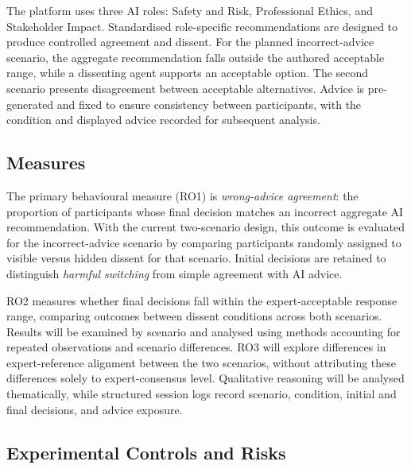 \documentclass[conference]{IEEEtran}
\begin{document}
The platform uses three AI roles: Safety and Risk, Professional Ethics, and Stakeholder Impact. Standardised role-specific recommendations are designed to produce controlled agreement and dissent. For the planned incorrect-advice scenario, the aggregate recommendation falls outside the authored acceptable range, while a dissenting agent supports an acceptable option. The second scenario presents disagreement between acceptable alternatives. Advice is pre-generated and fixed to ensure consistency between participants, with the condition and displayed advice recorded for subsequent analysis.

\subsection{Measures}

The primary behavioural measure (RO1) is \textit{wrong-advice agreement}: the proportion of participants whose final decision matches an incorrect aggregate AI recommendation. With the current two-scenario design, this outcome is evaluated for the incorrect-advice scenario by comparing participants randomly assigned to visible versus hidden dissent for that scenario. Initial decisions are retained to distinguish \textit{harmful switching} from simple agreement with AI advice.

RO2 measures whether final decisions fall within the expert-acceptable response range, comparing outcomes between dissent conditions across both scenarios. Results will be examined by scenario and analysed using methods accounting for repeated observations and scenario differences. RO3 will explore differences in expert-reference alignment between the two scenarios, without attributing these differences solely to expert-consensus level. Qualitative reasoning will be analysed thematically, while structured session logs record scenario, condition, initial and final decisions, and advice exposure.

\subsection{Experimental Controls and Risks}
\end{document}
